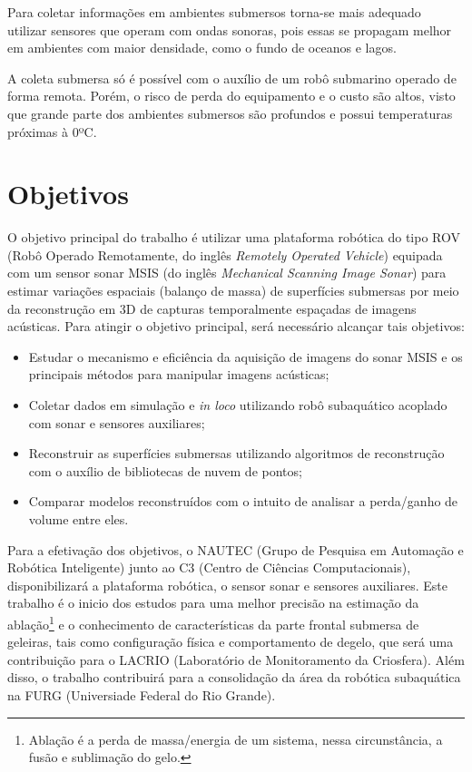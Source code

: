 Para coletar informações em ambientes submersos torna-se mais adequado utilizar sensores que operam com ondas sonoras, pois essas se propagam melhor em ambientes com maior densidade, como o fundo de oceanos e lagos.

A coleta submersa só é possível com o auxílio de um robô submarino operado de forma remota.
Porém, o risco de perda do equipamento e o custo são altos, visto que grande parte dos ambientes submersos são profundos e possui temperaturas próximas à 0ºC.

\section{Objetivos}
\label{sec:objetivos}

O objetivo principal do trabalho é utilizar uma plataforma robótica do tipo ROV (Robô Operado Remotamente, do inglês \textit{Remotely Operated Vehicle}) equipada com um sensor sonar MSIS (do inglês \textit{Mechanical Scanning Image Sonar}) para estimar variações espaciais (balanço de massa) de superfícies submersas por meio da reconstrução em 3D de capturas temporalmente espaçadas de imagens acústicas. 
Para atingir o objetivo principal, será necessário alcançar tais objetivos:

\begin{itemize}
    \item Estudar o mecanismo e eficiência da aquisição de imagens do sonar MSIS e os principais métodos para manipular imagens acústicas;
    \item Coletar dados em simulação e \textit{in loco} utilizando robô subaquático acoplado com sonar e sensores auxiliares;
    \item Reconstruir as superfícies submersas utilizando algoritmos de reconstrução com o auxílio de bibliotecas de nuvem de pontos;
    \item Comparar modelos reconstruídos com o intuito de analisar a perda/ganho de volume entre eles. 
\end{itemize}
\hspace{1em}

Para a efetivação dos objetivos, o NAUTEC (Grupo de Pesquisa em Automação e Robótica Inteligente) junto ao C3 (Centro de Ciências Computacionais), disponibilizará a plataforma robótica, o sensor sonar e sensores auxiliares. Este trabalho é o inicio dos estudos para uma melhor precisão na estimação da ablação\footnote{Ablação é a perda de massa/energia de um sistema, nessa circunstância, a fusão e sublimação do gelo.} e o conhecimento de características da parte frontal submersa de geleiras, tais como configuração física e comportamento de degelo, que será uma contribuição para o LACRIO (Laboratório de Monitoramento da Criosfera). Além disso, o trabalho contribuirá para a consolidação da área da robótica subaquática na FURG (Universiade Federal do Rio Grande).

